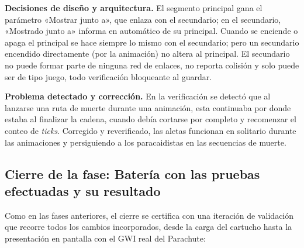 \textbf{Decisiones de diseño y arquitectura.} El segmento principal
gana el parámetro «Mostrar junto a», que enlaza con el secundario; en
el secundario, «Mostrado junto a» informa en automático de su
principal. Cuando se enciende o apaga el principal se hace siempre lo
mismo con el secundario; pero un secundario encendido directamente (por
la animación) no altera al principal. El secundario no puede formar
parte de ninguna red de enlaces, no reporta colisión y solo puede ser
de tipo juego, todo verificación bloqueante al guardar.

\textbf{Problema detectado y corrección.} En la verificación se detectó
que al lanzarse una ruta de muerte durante una animación, esta
continuaba por donde estaba al finalizar la cadena, cuando debía
cortarse por completo y recomenzar el conteo de \textit{ticks}. Corregido
y reverificado, las aletas funcionan en solitario durante las
animaciones y persiguiendo a los paracaidistas en las secuencias de
muerte.

\subsection{Cierre de la fase: Batería con las pruebas efectuadas y su resultado}
\label{sec:F3Pruebas}

Como en las fases anteriores, el cierre se certifica con una iteración
de validación que recorre todos los cambios incorporados, desde la
carga del cartucho hasta la presentación en pantalla con el GWI real
del Parachute:

